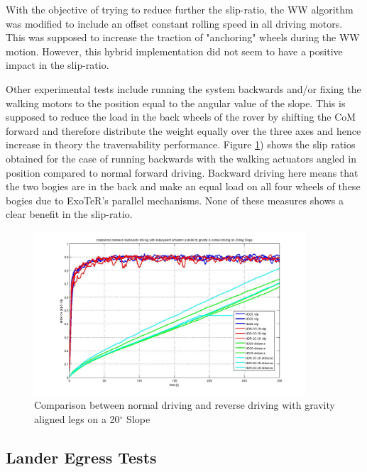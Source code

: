 \documentclass[a4paper,twocolumn]{esapub2005} %
\begin{document}
With the objective of trying to reduce further the slip-ratio, the WW algorithm
was modified to include an offset constant rolling speed in all driving motors.
This was supposed to increase the traction of "anchoring" wheels during the WW
motion. However, this hybrid implementation did not seem to have a positive
impact in the slip-ratio.

Other experimental tests include running the system backwards and/or fixing the
walking motors to the position equal to the angular value of the slope. This is
supposed to reduce the load in the back wheels of the rover by shifting the CoM
forward and therefore distribute the weight equally over the three axes and
hence increase in theory the traversability performance. Figure
\ref{fig:ndr20d}) shows the slip ratios obtained for the case of running
backwards with the walking actuators angled in position compared to normal
forward driving. Backward driving here means that the two bogies are in the
back and make an equal load on all four wheels of these bogies due to ExoTeR's
parallel mechanisms. None of these measures shows a clear benefit in the slip-ratio.

\begin{figure}[h!]
    \centering
    \includegraphics[width=0.9\textwidth]{ndr20d.jpg}	\caption{Comparison between
    normal driving and reverse driving with gravity aligned legs on a 20$^{\circ}$ Slope}
    \label{fig:ndr20d}
\end{figure}


\subsection{Lander Egress Tests} 
\end{document}
